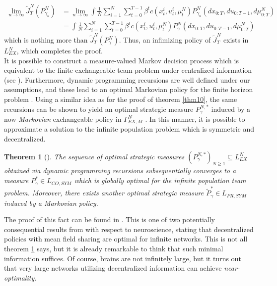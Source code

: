\documentclass[12pt, oneside]{report}
\newcommand{\1}[1]{\mathbbm{1}_{\{#1\}}}
\newtheorem{theorem}{Theorem}[section]
\theoremstyle{definition}
\begin{document}
\begin{align*}
    \lim_{n\rightarrow\infty}\widetilde{J}^N_T(P^N_{\gamma_n})&=\lim_{n\rightarrow\infty}\int\frac{1}{N}\sum_{i=1}^N\sum_{t=0}^{T-1}\beta^tc(x^i_t,u^i_t,\mu^N_t)P^N_{\gamma_n}(dx_{0:T},du_{0:T-1},d\mu^N_{0:T})\\
    &=\int\frac{1}{N}\sum_{i=1}^N\sum_{t=0}^{T-1}\beta^tc(x^i_t,u^i_t,\mu^N_t)P^N_{\gamma}(dx_{0:T},du_{0:T-1},d\mu^N_{0:T})
\end{align*}
which is nothing more than $\widetilde{J}^N_T(P^N_\gamma)$. Thus, an infimizing policy of $\widetilde{J}^N_T$ exists in $L^N_{EX}$, which completes the proof.\\[5pt]
\indent It is possible to construct a measure-valued Markov decision process which is equivalent to the finite exchangeable team problem under centralized information (see \cite[\S3, theorem 3.3]{Bauerle_2023}).
Furthermore, dynamic programming recursions are well defined under our assumptions, and these lead to an optimal Markovian policy for the finite horizon problem \cite[theorem 3.5]{Bauerle_2023}. Using a similar idea as for the proof of theorem \ref{thm10},
the same recursions can be shown to yield an optimal strategic measure $P^{N,\ast}_\gamma$ induced by a now \textit{Markovian} exchangeable policy in $\Gamma^N_{EX,M}$ \cite[theorem 2]{Sanjari_Saldi_Yüksel_2024}. In this manner, it is possible
to approximate a solution to the infinite population problem which is symmetric and decentralized.
\begin{theorem}[{\cite[theorem 3]{Sanjari_Saldi_Yüksel_2024}}]\label{thm11}
    The sequence of optimal strategic measures $(P^{N,\ast}_\gamma)_{N\geq 1}\subseteq L^N_{EX}$ obtained via dynamic programming recursions subsequentially converges to a measure $P^\ast_\gamma\in L_{CO,\mathit{SYM}}$
    which is globally optimal for the infinite population team problem. Moreover, there exists another optimal strategic measure $\widetilde{P}^\ast_\gamma\in L_{PR,\mathit{SYM}}$ induced by a Markovian policy.
\end{theorem}
The proof of this fact can be found in \cite[appendix G]{Sanjari_Saldi_Yüksel_2024}. This is one of two potentially consequential results from \cite{Sanjari_Saldi_Yüksel_2024} with respect to neuroscience, stating that
decentralized policies with mean field sharing are optimal for infinite networks. This is not all theorem \ref{thm11} says, but it is already remarkable to think that such minimal information suffices. Of course, brains are not infinitely large, but it turns out
that very large networks utilizing decentralized information can achieve \textit{near-optimality}.
\end{document}
